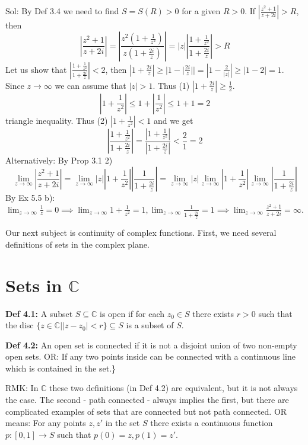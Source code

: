 \documentclass{article}
\begin{document}
Sol: By Def 3.4 we need to find $S=S(R)>0$ for a given $R>0$. If $|\frac{z^2+1}{z+2i}|>R$, then
$$ |\frac{z^2+1}{z+2i}| = |\frac{z^2(1+\frac{1}{z^2})}{z(1+\frac{2i}{z})}| = |z||\frac{1+\frac{1}{z^2}}{1+\frac{2i}{z}}| > R $$
Let us show that $|\frac{1+\frac{1}{z^2}}{1+\frac{2i}{z}}|<2$, then $|1+\frac{2i}{z}| \geq |1-|\frac{2i}{z}|| = |1-\frac{2}{|z|}| \geq |1-2| = 1$. Since $z\to\infty$ we can assume that $|z|>1$. Thus (1) $|1+\frac{2i}{z}|\geq \frac{1}{2}$.
$$ |1+\frac{1}{z^2}| \leq 1 + |\frac{1}{z^2}| \leq 1+1 = 2 $$
triangle inequality.
Thus (2) $\left|1 + \frac{1}{z^2}\right| < 1$ and we get
$$ \left|\frac{1 + \frac{1}{z^2}}{1 + \frac{2i}{z}}\right| = \frac{\left|1 + \frac{1}{z^2}\right|}{\left|1 + \frac{2i}{z}\right|} < \frac{2}{1} = 2 $$
Alternatively: By Prop 3.1 2)
$$ \lim_{z \to \infty} \left|\frac{z^2 + 1}{z + 2i}\right| = \lim_{z \to \infty} |z| \left|1 + \frac{1}{z^2}\right| \left|\frac{1}{1 + \frac{2i}{z}}\right| = \lim_{z \to \infty} |z| \lim_{z \to \infty} \left|1 + \frac{1}{z^2}\right| \lim_{z \to \infty} \left|\frac{1}{1 + \frac{2i}{z}}\right| $$
By Ex 5.5 b): $\lim_{z \to \infty} \frac{1}{z} = 0 \implies \lim_{z \to \infty} 1 + \frac{1}{z^2} = 1, \lim_{z \to \infty} \frac{1}{1 + \frac{2i}{z}} = 1 \implies \lim_{z \to \infty} \frac{z^2 + 1}{z + 2i} = \infty$.

Our next subject is continuity of complex functions. First, we need several definitions of sets in the complex plane.

\section{Sets in $\mathbb{C}$}

\textbf{Def 4.1:} A subset $S \subseteq \mathbb{C}$ is open if for each $z_0 \in S$ there exists $r > 0$ such that the disc $\{z \in \mathbb{C} | |z - z_0| < r\} \subseteq S$ is a subset of $S$.

\textbf{Def 4.2:} An open set is connected if it is not a disjoint union of two non-empty open sets. OR: If any two points inside can be connected with a continuous line which is contained in the set.\}

RMK: In $\mathbb{C}$ these two definitions (in Def 4.2) are equivalent, but it is not always the case. The second - path connected - always implies the first, but there are complicated examples of sets that are connected but not path connected. OR means: For any points $z, z'$ in the set $S$ there exists a continuous function $p: [0, 1] \to S$ such that $p(0) = z, p(1) = z'$.
\end{document}
